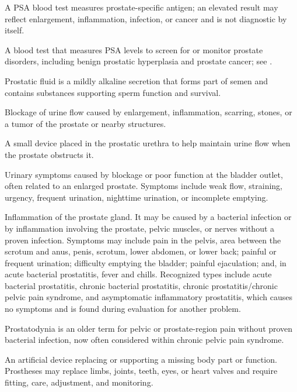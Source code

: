  A PSA blood test measures prostate-specific antigen; an elevated result may reflect enlargement, inflammation, infection, or cancer and is not diagnostic by itself.

 A blood test that measures PSA levels to screen for or monitor prostate disorders, including benign prostatic hyperplasia and prostate cancer; see .

 Prostatic fluid is a mildly alkaline secretion that forms part of semen and contains substances supporting sperm function and survival.

 Blockage of urine flow caused by enlargement, inflammation, scarring, stones, or a tumor of the prostate or nearby structures.

 A small device placed in the prostatic urethra to help maintain urine flow when the prostate obstructs it.

 Urinary symptoms caused by blockage or poor function at the bladder outlet, often related to an enlarged prostate. Symptoms include weak flow, straining, urgency, frequent urination, nighttime urination, or incomplete emptying.

 Inflammation of the prostate gland. It may be caused by a bacterial infection or by inflammation involving the prostate, pelvic muscles, or nerves without a proven infection. Symptoms may include pain in the pelvis, area between the scrotum and anus, penis, scrotum, lower abdomen, or lower back; painful or frequent urination; difficulty emptying the bladder; painful ejaculation; and, in acute bacterial prostatitis, fever and chills. Recognized types include acute bacterial prostatitis, chronic bacterial prostatitis, chronic prostatitis/chronic pelvic pain syndrome, and asymptomatic inflammatory prostatitis, which causes no symptoms and is found during evaluation for another problem.

 Prostatodynia is an older term for pelvic or prostate-region pain without proven bacterial infection, now often considered within chronic pelvic pain syndrome.

 An artificial device replacing or supporting a missing body part or function. Prostheses may replace limbs, joints, teeth, eyes, or heart valves and require fitting, care, adjustment, and monitoring.


